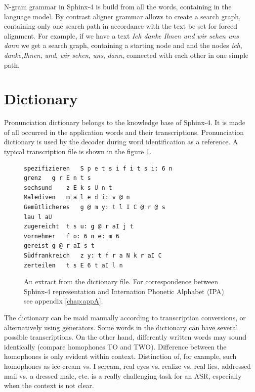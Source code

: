 N-gram grammar in Sphinx-4 is build from all the words, containing in the
language model. By contrast aligner grammar allows to create a search graph,
containing only one search path in accordance with the text be set for forced
alignment. For example, if we have a text \textit {Ich danke Ihnen und wir
sehen uns dann} we get a search graph, containing  a starting node and and the
nodes \textit{ich}, \textit {danke},\textit{Ihnen}, \textit{und}, \textit {wir}
\textit {sehen}, \textit{uns}, \textit {dann}, connected with each other in one
simple path.
\section {Dictionary} 

Pronunciation dictionary belongs to the knowledge base of Sphinx-4. It is made
of all occurred in the application words and their transcriptions. Pronunciation dictionary is used by the decoder 
during word identification as a reference. 
A typical transcription file is shown in the figure \ref {fig:dic}.
\newline
\begin{figure}[htbp]
{}
%  
%  
\begin{lstlisting}[frame=single]
spezifizieren	S p e t s i f i t s i: 6 n  
grenz	g r E n t s 
sechsund	z E k s U n t
Malediven	m a l e d i: v @ n
Gemütlicheres	g @ m y: t l I C @ r @ s
lau	l aU
zugereicht	t s u: g @ r aI j t
vornehmer	f o: 6 n e: m 6
gereist	g @ r aI s t
Südfrankreich	z y: t f r a N k r aI C
zerteilen	t s E 6 t aI l n
\end{lstlisting}
 \caption{An extract from the dictionary file. For correspondence between
 Sphinx-4 representation and Internation Phonetic Alphabet (IPA) see appendix
 \ref{chap:appA}.
 }
  \label{fig:dic}
\end {figure}
\newline
The dictionary can be maid manually according to transcription conversions, or
alternatively using generators. Some words in the dictionary can have several possible transcriptions. On the other hand, differently written words 
may sound identically (compare homophones TO and TWO). Difference between the homophones is only evident within context. Distinction of, for 
example, such homophones as ice-cream vs. I scream, real eyes vs. realize vs. real lies, addressed mail vs. a dressed male, etc. is a really 
challenging task for an ASR, especially when the context is not clear.

